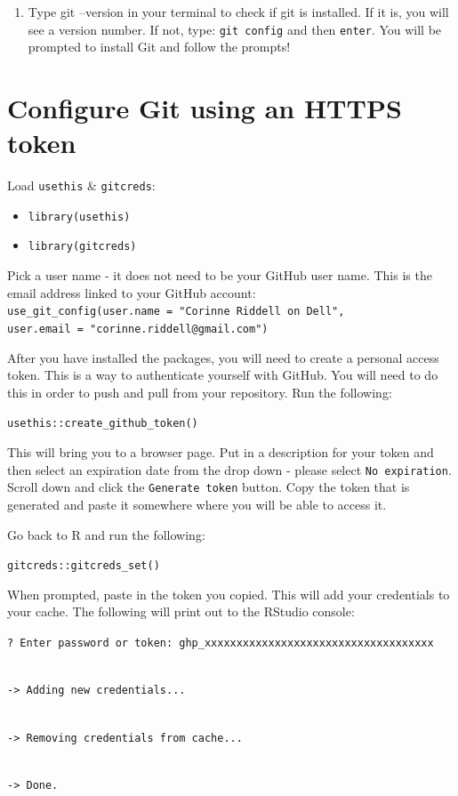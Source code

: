 \documentclass[
]{book}
\providecommand{\tightlist}{%
  \setlength{\itemsep}{0pt}\setlength{\parskip}{0pt}}
\begin{document}
\begin{enumerate}
\def\labelenumi{\arabic{enumi})}
\tightlist
\item
  Type git --version in your terminal to check if git is installed. If it is, you will see a version number. If not, type:
  \texttt{git\ config} and then \texttt{enter}. You will be prompted to install Git and follow the prompts!
\end{enumerate}

\hypertarget{configure-git-using-an-https-token}{%
\section{Configure Git using an HTTPS token}\label{configure-git-using-an-https-token}}

Load \texttt{usethis} \& \texttt{gitcreds}:

\begin{itemize}
\tightlist
\item
  \texttt{library(usethis)}
\item
  \texttt{library(gitcreds)}
\end{itemize}

Pick a user name - it does not need to be your GitHub user name. This is the email address linked to your GitHub account:\\
\texttt{use\_git\_config(user.name\ =\ "Corinne\ Riddell\ on\ Dell",}
\texttt{user.email\ =\ "corinne.riddell@gmail.com")}

After you have installed the packages, you will need to create a personal access token. This is a way to authenticate yourself with GitHub. You will need to do this in order to push and pull from your repository. Run the following:

\texttt{usethis::create\_github\_token()}

This will bring you to a browser page. Put in a description for your token and then select an expiration date from the drop down - please select \texttt{No\ expiration}. Scroll down and click the \texttt{Generate\ token} button. Copy the token that is generated and paste it somewhere where you will be able to access it.

Go back to R and run the following:

\texttt{gitcreds::gitcreds\_set()}

When prompted, paste in the token you copied. This will add your credentials to your cache. The following will print out to the RStudio console:

\texttt{?\ Enter\ password\ or\ token:\ ghp\_xxxxxxxxxxxxxxxxxxxxxxxxxxxxxxxxxxxx}\strut \\
\texttt{-\textgreater{}\ Adding\ new\ credentials...}\strut \\
\texttt{-\textgreater{}\ Removing\ credentials\ from\ cache...}\strut \\
\texttt{-\textgreater{}\ Done.}
\end{document}
